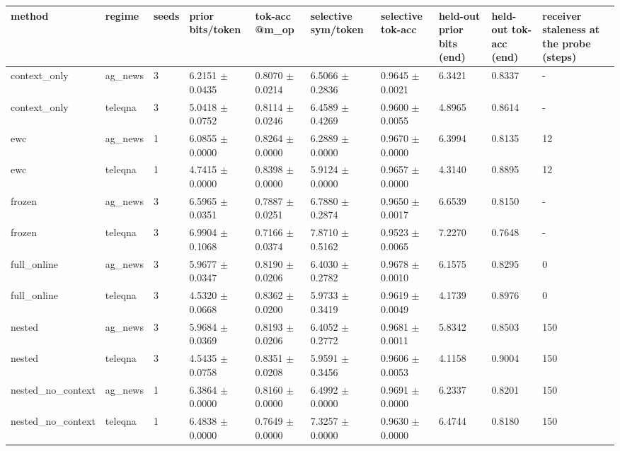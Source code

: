 \begin{tabular}{llllllllll}
\hline
method & regime & seeds & prior bits/token & tok-acc @m\_op & selective sym/token & selective tok-acc & held-out prior bits (end) & held-out tok-acc (end) & receiver staleness at the probe (steps) \\
\hline
context\_only & ag\_news & 3 & 6.2151 $\pm$ 0.0435 & 0.8070 $\pm$ 0.0214 & 6.5066 $\pm$ 0.2836 & 0.9645 $\pm$ 0.0021 & 6.3421 & 0.8337 & - \\
context\_only & teleqna & 3 & 5.0418 $\pm$ 0.0752 & 0.8114 $\pm$ 0.0246 & 6.4589 $\pm$ 0.4269 & 0.9600 $\pm$ 0.0055 & 4.8965 & 0.8614 & - \\
ewc & ag\_news & 1 & 6.0855 $\pm$ 0.0000 & 0.8264 $\pm$ 0.0000 & 6.2889 $\pm$ 0.0000 & 0.9670 $\pm$ 0.0000 & 6.3994 & 0.8135 & 12 \\
ewc & teleqna & 1 & 4.7415 $\pm$ 0.0000 & 0.8398 $\pm$ 0.0000 & 5.9124 $\pm$ 0.0000 & 0.9657 $\pm$ 0.0000 & 4.3140 & 0.8895 & 12 \\
frozen & ag\_news & 3 & 6.5965 $\pm$ 0.0351 & 0.7887 $\pm$ 0.0251 & 6.7880 $\pm$ 0.2874 & 0.9650 $\pm$ 0.0017 & 6.6539 & 0.8150 & - \\
frozen & teleqna & 3 & 6.9904 $\pm$ 0.1068 & 0.7166 $\pm$ 0.0374 & 7.8710 $\pm$ 0.5162 & 0.9523 $\pm$ 0.0065 & 7.2270 & 0.7648 & - \\
full\_online & ag\_news & 3 & 5.9677 $\pm$ 0.0347 & 0.8190 $\pm$ 0.0206 & 6.4030 $\pm$ 0.2782 & 0.9678 $\pm$ 0.0010 & 6.1575 & 0.8295 & 0 \\
full\_online & teleqna & 3 & 4.5320 $\pm$ 0.0668 & 0.8362 $\pm$ 0.0200 & 5.9733 $\pm$ 0.3419 & 0.9619 $\pm$ 0.0049 & 4.1739 & 0.8976 & 0 \\
nested & ag\_news & 3 & 5.9684 $\pm$ 0.0369 & 0.8193 $\pm$ 0.0206 & 6.4052 $\pm$ 0.2772 & 0.9681 $\pm$ 0.0011 & 5.8342 & 0.8503 & 150 \\
nested & teleqna & 3 & 4.5435 $\pm$ 0.0758 & 0.8351 $\pm$ 0.0208 & 5.9591 $\pm$ 0.3456 & 0.9606 $\pm$ 0.0053 & 4.1158 & 0.9004 & 150 \\
nested\_no\_context & ag\_news & 1 & 6.3864 $\pm$ 0.0000 & 0.8160 $\pm$ 0.0000 & 6.4992 $\pm$ 0.0000 & 0.9691 $\pm$ 0.0000 & 6.2337 & 0.8201 & 150 \\
nested\_no\_context & teleqna & 1 & 6.4838 $\pm$ 0.0000 & 0.7649 $\pm$ 0.0000 & 7.3257 $\pm$ 0.0000 & 0.9630 $\pm$ 0.0000 & 6.4744 & 0.8180 & 150 \\

\end{tabular}
